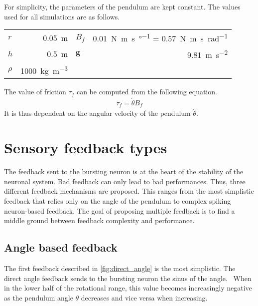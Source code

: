 For simplicity, the parameters of the pendulum are kept constant. The values used for all simulations are as follows.
{

\large\centering
\begin{tabular}{lr|lr}
    $r$     & \qty{0.05}{\meter}                  & $B_f$    & \qty{0.01}{\newton\meter\second\per\degree} = \qty{0.57}{\newton\meter\second\per\radian}\\
    $h$     & \qty{0.5}{\meter}                   & $\mathbf{g}$    & \qty{9.81}{\meter\per\second\squared}\\
    $\rho$  & \qty{1000}{\kg\per\cubic\meter}     &               & \\
\end{tabular}

}

The value of friction $\tau_f$ can be computed from the following equation.
\begin{align}
    \tau_f = \dot{\theta}B_f
\end{align}
It is thus dependent on the angular velocity of the pendulum $\dot{\theta}$.

\section{Sensory feedback types}

The feedback sent to the bursting neuron is at the heart of the stability of the neuronal system.
Bad feedback can only lead to bad performances.
Thus, three different feedback mechanisms are proposed.
This ranges from the most simplistic feedback that relies only on the angle of the pendulum to complex spiking neuron-based feedback.
The goal of proposing multiple feedback is to find a middle ground between feedback complexity and performance.

\subsection{Angle based feedback}

The first feedback described in \cref{fig:direct_angle} is the most simplistic.
The direct angle feedback sends to the bursting neuron the sinus of the angle. 
When in the lower half of the rotational range, this value becomes increasingly negative as the pendulum angle $\theta$ decreases and vice versa when increasing.

